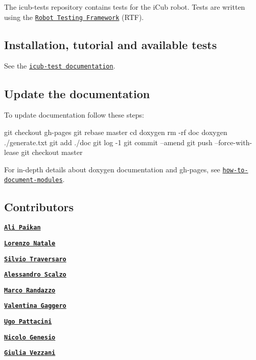 The {\ttfamily icub-\/tests} repository contains tests for the i\+Cub robot. Tests are written using the \href{https://github.com/robotology/robot-testing}{\tt Robot Testing Framework} (R\+TF).

\subsection*{Installation, tutorial and available tests}

See the \href{https://robotology.github.io/icub-tests/}{\tt icub-\/test documentation}.

\subsection*{Update the documentation}

To update documentation follow these steps\+:


\begin{DoxyCode}
git checkout gh-pages
git rebase master
cd doxygen
rm -rf doc
doxygen ./generate.txt
git add ./doc
git log -1
git commit --amend
git push --force-with-lease
git checkout master
\end{DoxyCode}
 For in-\/depth details about doxygen documentation and gh-\/pages, see \href{https://github.com/robotology/how-to-document-modules}{\tt how-\/to-\/document-\/modules}.

\subsection*{Contributors}


\begin{DoxyItemize}
\item \href{https://github.com/apaikan}{\tt {\bfseries Ali Paikan}}
\item \href{https://github.com/lornat75}{\tt {\bfseries Lorenzo Natale}}
\item \href{https://github.com/traversaro}{\tt {\bfseries Silvio Traversaro}}
\item \href{https://github.com/ale-git}{\tt {\bfseries Alessandro Scalzo}}
\item \href{https://github.com/randaz81}{\tt {\bfseries Marco Randazzo}}
\item \href{https://github.com/valegagge}{\tt {\bfseries Valentina Gaggero}}
\item \href{https://github.com/pattacini}{\tt {\bfseries Ugo Pattacini}}
\item \href{https://github.com/Nicogene}{\tt {\bfseries Nicolo\textquotesingle{} Genesio}}
\item \href{https://github.com/giuliavezzani}{\tt {\bfseries Giulia Vezzani}} 
\end{DoxyItemize}